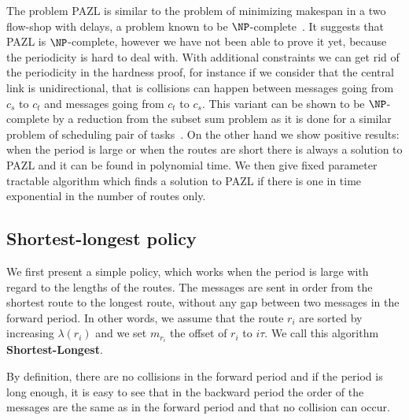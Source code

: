 \documentclass[10pt, conference, letterpaper]{IEEEtran}
\begin{document}
  The problem PAZL is similar to the problem of minimizing makespan in a two flow-shop with delays, a problem known to be $\NP$-complete~\cite{yu2004minimizing}. It suggests that PAZL is $\NP$-complete, however we have not been able to prove it yet,
  because the periodicity is hard to deal with. With additional constraints we can get rid of the periodicity in the hardness proof, for instance if we consider that the central link is unidirectional, that is collisions can happen between messages going from $c_s$ to $c_t$ and messages  going from $c_t$ to $c_s$. This variant can be shown to be $\NP$-complete by a reduction from the subset sum problem as it is done for a similar problem of scheduling pair of tasks~\cite{orman1997complexity}.
  On the other hand we show positive results:  when the period is large or when the routes are short there is always a solution to PAZL and it can be found in polynomial time. We then give fixed parameter tractable algorithm which finds a solution to PAZL if there is one in time exponential in the number of routes only. 
  
\subsection{Shortest-longest policy}
    

    We first present a simple policy, which works when the period is large with regard to the lengths of the routes.
    The messages are sent in order from the shortest route to the longest route, without any gap between two messages in the forward period.
    In other words, we assume that the route $r_i$ are sorted by increasing $\lambda(r_i)$ and we set $m_{r_i}$ the offset of $r_i$ to $i\tau$. We call this algorithm {\bf Shortest-Longest}.
      
     By definition, there are no collisions in the forward period and if the period is long enough, 
     it is easy to see that in the backward period the order of the messages are the same as in the forward period and that no collision can occur. 
      
\end{document}
